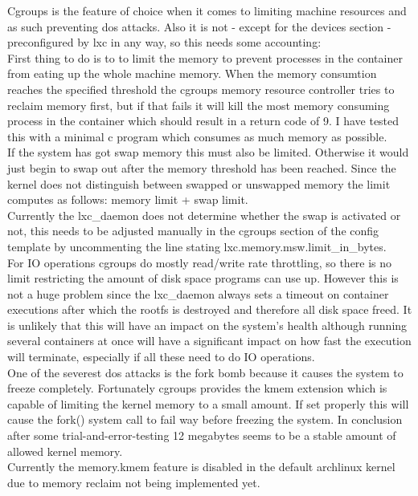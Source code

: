 Cgroups is the feature of choice when it comes to limiting machine resources and as such preventing dos attacks.
Also it is not - except for the devices section - preconfigured by lxc in any way, so this needs some accounting:\\
First thing to do is to to limit the memory to prevent processes in the container from eating up the whole machine memory.
When the memory consumtion reaches the specified threshold the cgroups memory resource controller tries to reclaim memory first,
but if that fails it will kill the most memory consuming process in the container which should result in a return code of 9\cite{cgrpmem}.
I have tested this with a minimal c program which consumes as much memory as possible.\\
If the system has got swap memory this must also be limited. Otherwise it would just begin to swap out after the memory
threshold has been reached. Since the kernel does not distinguish between swapped or unswapped memory the limit computes as follows:
memory limit + swap limit.\\
Currently the lxc\_daemon does not determine whether the swap is activated or not, this needs to be adjusted manually in the cgroups
section of the config template by uncommenting the line stating lxc.memory.msw.limit\_in\_bytes.\\
For IO operations cgroups do mostly read/write rate throttling, so there is no limit restricting the amount of disk space programs
can use up. However this is not a huge problem since the lxc\_daemon always sets a timeout on container executions after which the
rootfs is destroyed and therefore all disk space freed. It is unlikely that this will have an impact on the system's health although
running several containers at once will have a significant impact on how fast the execution will terminate, especially if all these
need to do IO operations.\\
One of the severest dos attacks is the fork bomb because it causes the system to freeze completely\cite{forkbomb}. Fortunately cgroups provides
the kmem extension which is capable of limiting the kernel memory to a small amount. If set properly this will cause the fork()
system call to fail way before freezing the system. In conclusion after some trial-and-error-testing 12 megabytes seems to be a
stable amount of allowed kernel memory.\\
Currently the memory.kmem feature is disabled in the default archlinux kernel due to memory reclaim not being implemented yet\cite{kmembug}.\\

